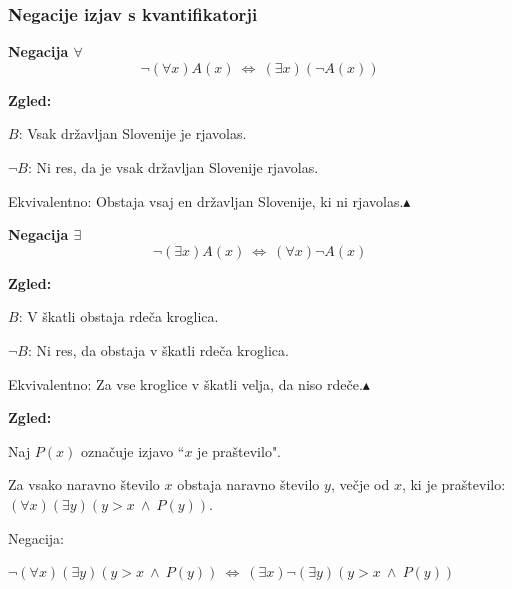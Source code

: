 \documentclass[11pt,paper=b5,footinclude,headinclude]{scrbook} %
\def\ali {{~\vee~}}
\def\inn {{~\wedge~}}
\def\sledi {{~\Rightarrow~}}
\def\cee {{~\Leftrightarrow~}}
\def\zgled{\noindent\textbf{\color{blue} Zgled: }}
\def\kz{{\hfill{\color{blue}$\blacktriangle$}}}%
\begin{document}
\subsubsection{Negacije izjav s kvantifikatorji}

\textbf{ Negacija $\forall$}
$$\neg (\forall x)A(x) \cee  (\exists x) (\neg A(x))$$

\medskip
\zgled

$B$: Vsak državljan Slovenije je rjavolas.

$\neg B$: Ni res, da je vsak državljan Slovenije rjavolas.

Ekvivalentno: Obstaja vsaj en državljan Slovenije, ki ni rjavolas.\kz

\medskip

\noindent\textbf{ Negacija $\exists$}
$$\neg  (\exists x)A(x) \cee (\forall x) \neg A(x)$$

\medskip
\zgled

$B$: V škatli obstaja rdeča kroglica.

$\neg B$: Ni res, da obstaja v škatli rdeča kroglica.

Ekvivalentno: Za vse kroglice v škatli velja, da niso rdeče.\kz


%
%
%
%
%
%
%
%
%
%
%
%
%
\zgled

Naj $P(x)$ označuje izjavo ``$x$ je praštevilo".

Za vsako naravno število $x$ obstaja naravno število $y$, večje od $x$, ki je praštevilo:
  $(\forall x)(\exists y)(y>x\inn P(y))$.

  Negacija:

  $\neg (\forall x)(\exists y)(y>x\inn P(y)) \cee(\exists  x)\neg (\exists y)(y>x\inn P(y))$
\end{document}
